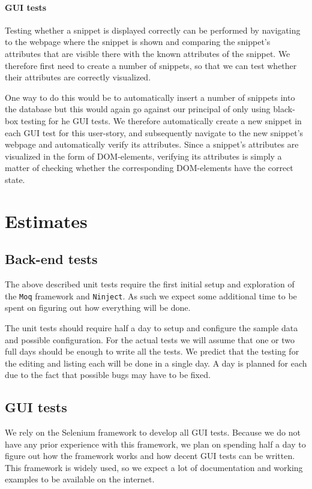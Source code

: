 \documentclass[10pt,a4paper,BCOR12mm, headexclude, footexclude,
  twoside, openright]{scrartcl}
\numberwithin{equation}{section} %
\numberwithin{figure}{section} %
\numberwithin{table}{section} %
\begin{document}
\paragraph{GUI tests}
Testing whether a snippet is displayed correctly can be performed by navigating to the webpage where the snippet is shown and comparing the snippet's attributes that are visible there with the known attributes of the snippet.
We therefore first need to create a number of snippets, so that we can test whether their attributes are correctly visualized.

One way to do this would be to automatically insert a number of snippets into the database but this would again go against our principal of only using black-box testing for he GUI tests.
We therefore automatically create a new snippet in each GUI test for this user-story, and subsequently navigate to the new snippet's webpage and automatically verify its attributes.
Since a snippet's attributes are visualized in the form of DOM-elements, verifying its attributes is simply a matter of checking whether the corresponding DOM-elements have the correct state.

\section{Estimates}
\subsection{Back-end tests}
The above described unit tests require the first initial setup and exploration
of the \texttt{Moq} framework and \texttt{Ninject}. As such we expect some
additional time to be spent on figuring out how everything will be done.

The unit tests should require half a day to setup and configure the sample data
and possible configuration. For the actual tests we will assume that one or two
full days should be enough to write all the tests. We predict that the testing
for the editing and listing each will be done in a single day. A day is planned
for each due to the fact that possible bugs may have to be fixed.
\subsection{GUI tests}
We rely on the Selenium framework to develop all GUI tests. Because we do not have any prior experience with this framework, we plan on spending half a day to figure out how the framework works and how decent GUI tests can be written.
This framework is widely used, so we expect a lot of documentation and working examples to be available on the internet.
\end{document}
